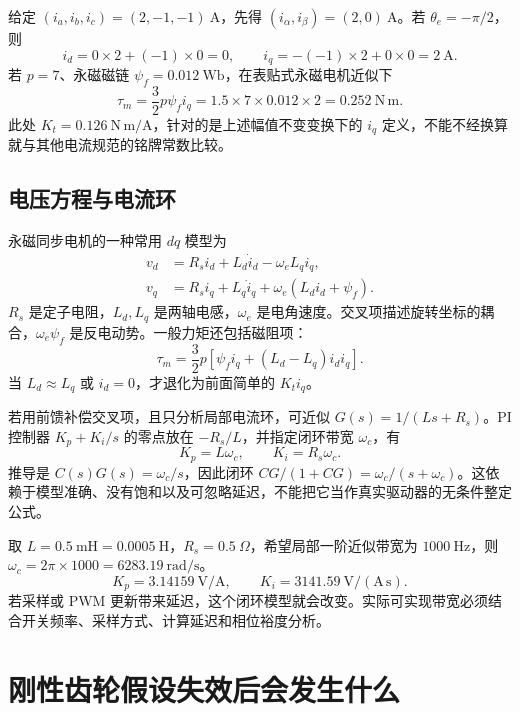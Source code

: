 \begin{examplebox}[算例 7C 三相电流怎样变成力矩电流]
给定 $(i_a,i_b,i_c)=(2,-1,-1)\ \mathrm A$，先得 $(i_\alpha,i_\beta)=(2,0)\ \mathrm A$。若 $\theta_e=-\pi/2$，则
\[
 i_d=0\times2+(-1)\times0=0,\qquad
 i_q=-(-1)\times2+0\times0=2\ \mathrm A.
\]
若 $p=7$、永磁磁链 $\psi_f=0.012\ \mathrm{Wb}$，在表贴式永磁电机近似下
\[
 \tau_m=\frac32p\psi_f i_q=1.5\times7\times0.012\times2=0.252\ \mathrm{N\,m}.
\]
此处 $K_t=0.126\ \mathrm{N\,m/A}$，针对的是上述幅值不变变换下的 $i_q$ 定义，不能不经换算就与其他电流规范的铭牌常数比较。
\end{examplebox}

\subsection{电压方程与电流环}
永磁同步电机的一种常用 $dq$ 模型为
\begin{align}
 v_d&=R_si_d+L_d\dot i_d-\omega_eL_qi_q,\\
 v_q&=R_si_q+L_q\dot i_q+\omega_e(L_di_d+\psi_f).
\end{align}
$R_s$ 是定子电阻，$L_d,L_q$ 是两轴电感，$\omega_e$ 是电角速度。交叉项描述旋转坐标的耦合，$\omega_e\psi_f$ 是反电动势。一般力矩还包括磁阻项：
\begin{equation}
 \tau_m=\frac32p\left[\psi_fi_q+(L_d-L_q)i_di_q\right].
\end{equation}
当 $L_d\approx L_q$ 或 $i_d=0$，才退化为前面简单的 $K_t i_q$。

若用前馈补偿交叉项，且只分析局部电流环，可近似 $G(s)=1/(Ls+R_s)$。PI 控制器 $K_p+K_i/s$ 的零点放在 $-R_s/L$，并指定闭环带宽 $\omega_c$，有
\[
 K_p=L\omega_c,\qquad K_i=R_s\omega_c.
\]
推导是 $C(s)G(s)=\omega_c/s$，因此闭环 $CG/(1+CG)=\omega_c/(s+\omega_c)$。这依赖于模型准确、没有饱和以及可忽略延迟，不能把它当作真实驱动器的无条件整定公式。

\begin{examplebox}[算例 7D 电流 PI 的单位与数值]
取 $L=0.5\ \mathrm{mH}=0.0005\ \mathrm H$，$R_s=0.5\ \Omega$，希望局部一阶近似带宽为 $1000\ \mathrm{Hz}$，则 $\omega_c=2\pi\times1000=6283.19\ \mathrm{rad/s}$。
\[
 K_p=3.14159\ \mathrm{V/A},\qquad K_i=3141.59\ \mathrm{V/(A\,s)}.
\]
若采样或 PWM 更新带来延迟，这个闭环模型就会改变。实际可实现带宽必须结合开关频率、采样方式、计算延迟和相位裕度分析。
\end{examplebox}

\section{刚性齿轮假设失效后会发生什么}
